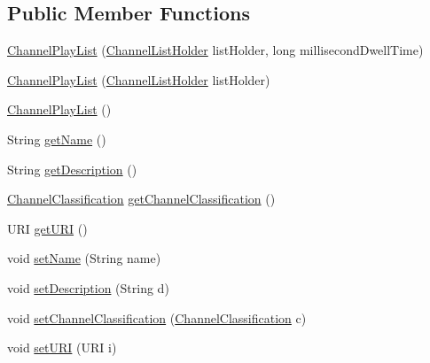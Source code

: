\subsection*{Public Member Functions}
\begin{DoxyCompactItemize}
\item 
\hyperlink{classgov_1_1fnal_1_1ppd_1_1dd_1_1channel_1_1ChannelPlayList_ae3affc943df1f88088d8e3ffd9377ed3}{Channel\-Play\-List} (\hyperlink{interfacegov_1_1fnal_1_1ppd_1_1dd_1_1channel_1_1ChannelListHolder}{Channel\-List\-Holder} list\-Holder, long millisecond\-Dwell\-Time)
\item 
\hyperlink{classgov_1_1fnal_1_1ppd_1_1dd_1_1channel_1_1ChannelPlayList_a501e9386af6bd9603c2bb1e68aff17eb}{Channel\-Play\-List} (\hyperlink{interfacegov_1_1fnal_1_1ppd_1_1dd_1_1channel_1_1ChannelListHolder}{Channel\-List\-Holder} list\-Holder)
\item 
\hyperlink{classgov_1_1fnal_1_1ppd_1_1dd_1_1channel_1_1ChannelPlayList_af6a62dd284fed342597292000aece6c3}{Channel\-Play\-List} ()
\item 
String \hyperlink{classgov_1_1fnal_1_1ppd_1_1dd_1_1channel_1_1ChannelPlayList_a1c2d3e0fcb9cee5cad06dc3d7bdb96e9}{get\-Name} ()
\item 
String \hyperlink{classgov_1_1fnal_1_1ppd_1_1dd_1_1channel_1_1ChannelPlayList_a1b1c73554407ef5d5f8f7f3b239a1f12}{get\-Description} ()
\item 
\hyperlink{classgov_1_1fnal_1_1ppd_1_1dd_1_1changer_1_1ChannelClassification}{Channel\-Classification} \hyperlink{classgov_1_1fnal_1_1ppd_1_1dd_1_1channel_1_1ChannelPlayList_a8e1ce06c00064455483d664b4d0fef17}{get\-Channel\-Classification} ()
\item 
U\-R\-I \hyperlink{classgov_1_1fnal_1_1ppd_1_1dd_1_1channel_1_1ChannelPlayList_a6f2e7a1655fb99a2e711c225912d2d79}{get\-U\-R\-I} ()
\item 
void \hyperlink{classgov_1_1fnal_1_1ppd_1_1dd_1_1channel_1_1ChannelPlayList_add9a4e4bdd0370b68ed3190ba1677070}{set\-Name} (String name)
\item 
void \hyperlink{classgov_1_1fnal_1_1ppd_1_1dd_1_1channel_1_1ChannelPlayList_a1321936810234139f911c5a1c7d6a7af}{set\-Description} (String d)
\item 
void \hyperlink{classgov_1_1fnal_1_1ppd_1_1dd_1_1channel_1_1ChannelPlayList_a145fde3f59f8025e8c79117024d5d3ab}{set\-Channel\-Classification} (\hyperlink{classgov_1_1fnal_1_1ppd_1_1dd_1_1changer_1_1ChannelClassification}{Channel\-Classification} c)
\item 
void \hyperlink{classgov_1_1fnal_1_1ppd_1_1dd_1_1channel_1_1ChannelPlayList_a7bb16de560ccbd745ee6a4f12e7756ae}{set\-U\-R\-I} (U\-R\-I i)

\end{DoxyCompactItemize}
